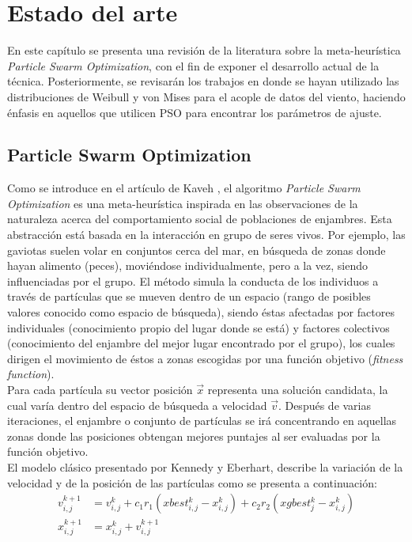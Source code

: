 
\chapter{Estado del arte}
En este capítulo se presenta una revisión de la literatura sobre la meta-heurística \emph{Particle Swarm Optimization}, con el fin de exponer el desarrollo actual de la técnica. Posteriormente, se revisarán los trabajos en donde se hayan utilizado las distribuciones de Weibull y von Mises para el acople de datos del viento, haciendo énfasis en aquellos que utilicen PSO para encontrar los parámetros de ajuste.

\section{Particle Swarm Optimization}
Como se introduce en el artículo de Kaveh \cite{Psoexplain14}, el algoritmo \emph{Particle Swarm Optimization} es una meta-heurística inspirada en las observaciones de la naturaleza acerca del comportamiento social de poblaciones de enjambres. Esta abstracción está basada en la interacción en grupo de seres vivos. Por ejemplo, las gaviotas suelen volar en conjuntos cerca del mar, en búsqueda de zonas donde hayan alimento (peces), moviéndose individualmente, pero a la vez, siendo influenciadas por el grupo. El método simula la conducta de los individuos a través de partículas que se mueven dentro de un espacio (rango de posibles valores conocido como espacio de búsqueda), siendo éstas afectadas por factores individuales (conocimiento propio del lugar donde se está) y factores colectivos (conocimiento del enjambre del mejor lugar encontrado por el grupo), los cuales dirigen el movimiento de éstos a zonas escogidas por una función objetivo (\emph{fitness function}).\\
Para cada partícula su vector posición  $\vec{x}$ representa una solución candidata, la cual varía dentro del espacio de búsqueda a velocidad $\vec{v}$. Después de varias iteraciones, el enjambre o conjunto de partículas se irá concentrando en aquellas zonas donde las posiciones obtengan mejores puntajes al ser evaluadas por la función objetivo.
\\El modelo clásico presentado por Kennedy y Eberhart\cite{Kennedy95}, describe la variación de la velocidad y de la posición de las partículas como se presenta a continuación:
\begin{align}
    v_{i,j}^{k+1} &= v_{i,j}^{k} + c_{1}r_{1}(xbest_{i,j}^k - x_{i,j}^k) + c_{2}r_{2}(xgbest_{j}^{k} - x_{i,j}^k) \\
    x_{i,j}^{k+1} &= x_{i,j}^{k} + v_{i,j}^{k+1}
\end{align}    
